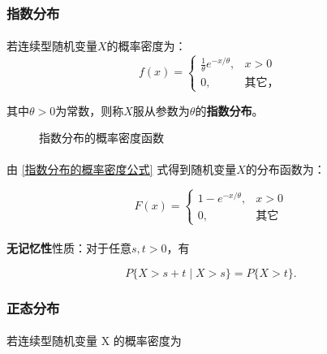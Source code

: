 \subsubsection{指数分布}
\paragraph{}
若连续型随机变量$X$的概率密度为：
\begin{equation}
  \label{指数分布的概率密度公式}
  f(x) = \left\{ \begin{array}{ll}
    \frac{1}{\theta}e^{-x/\theta}, & x > 0 \\ 0, & \text{其它，}
  \end{array} \right.
\end{equation}

其中$\theta > 0$为常数，则称$X$服从参数为$\theta$的\textbf{指数分布}。

\begin{figure}[H]
  \centering
    
    \caption{指数分布的概率密度函数}
    \label{指数分布的概率密度函数}
\end{figure}

\paragraph{}
由 \eqref{指数分布的概率密度公式} 式得到随机变量$X$的分布函数为：

\begin{equation}
  F(x) = \left\{ \begin{array}{ll}
    1 - e^{-x/\theta}, & x > 0 \\ 0, & \text{其它}
  \end{array} \right.
\end{equation}

\paragraph{}
\textbf{无记忆性}性质：对于任意$s,t>0$，有

\begin{equation}
  P\{X > s + t \;|\; X > s\} = P\{X > t\}.
\end{equation}

\subsubsection{正态分布}
\paragraph{}
若连续型随机变量 X 的概率密度为

